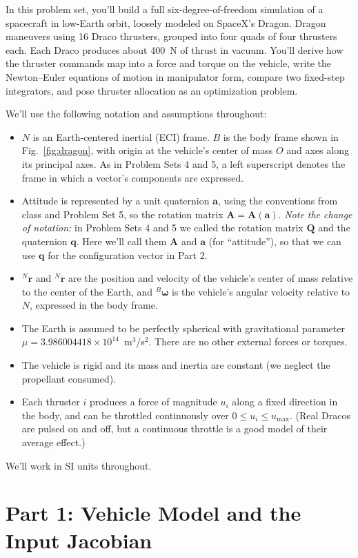 \documentclass[11pt,letterpaper]{article}
\newcommand{\Bw}{{}^{B}\boldsymbol{\omega}}
\newcommand{\bA}{\mathbf{A}}
\newcommand{\ba}{\mathbf{a}}
\newcommand{\bq}{\mathbf{q}}
\newcommand{\Nr}{{}^{N}\mathbf{r}}
\newcommand{\Nrd}{{}^{N}\dot{\mathbf{r}}}
\begin{document}
\noindent In this problem set, you'll build a full six-degree-of-freedom simulation of a spacecraft in low-Earth orbit, loosely modeled on SpaceX's Dragon. Dragon maneuvers using 16 Draco thrusters, grouped into four quads of four thrusters each. Each Draco produces about 400~N of thrust in vacuum. You'll derive how the thruster commands map into a force and torque on the vehicle, write the Newton--Euler equations of motion in manipulator form, compare two fixed-step integrators, and pose thruster allocation as an optimization problem.

We'll use the following notation and assumptions throughout:
\begin{itemize}
    \item $N$ is an Earth-centered inertial (ECI) frame. $B$ is the body frame shown in Fig.~\ref{fig:dragon}, with origin at the vehicle's center of mass $O$ and axes along its principal axes. As in Problem Sets 4 and 5, a left superscript denotes the frame in which a vector's components are expressed.
    \item Attitude is represented by a unit quaternion $\ba$, using the conventions from class and Problem Set 5, so the rotation matrix $\bA = \bA(\ba)$. \emph{Note the change of notation:} in Problem Sets 4 and 5 we called the rotation matrix $\mathbf{Q}$ and the quaternion $\mathbf{q}$. Here we'll call them $\bA$ and $\ba$ (for ``attitude''), so that we can use $\bq$ for the configuration vector in Part 2.
    \item $\Nr$ and $\Nrd$ are the position and velocity of the vehicle's center of mass relative to the center of the Earth, and $\Bw$ is the vehicle's angular velocity relative to $N$, expressed in the body frame.
    \item The Earth is assumed to be perfectly spherical with gravitational parameter $\mu = 3.986004418\times10^{14}$~m$^3$/s$^2$. There are no other external forces or torques.
    \item The vehicle is rigid and its mass and inertia are constant (we neglect the propellant consumed).
    \item Each thruster $i$ produces a force of magnitude $u_i$ along a fixed direction in the body, and can be throttled continuously over $0 \le u_i \le u_{\max}$. (Real Dracos are pulsed on and off, but a continuous throttle is a good model of their average effect.)
\end{itemize}
We'll work in SI units throughout.

\section*{Part 1: Vehicle Model and the Input Jacobian}
\end{document}
